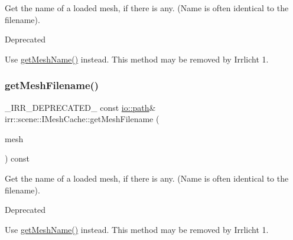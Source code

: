 Get the name of a loaded mesh, if there is any. (Name is often identical to the filename). 

\begin{DoxyRefDesc}{Deprecated}
\item[\hyperlink{deprecated__deprecated000011}{Deprecated}]Use \hyperlink{classirr_1_1scene_1_1IMeshCache_af06efb8fb21f6bba16e52d879b5d3ddd}{get\+Mesh\+Name()} instead. This method may be removed by Irrlicht 1. \end{DoxyRefDesc}
\mbox{\label{classirr_1_1scene_1_1IMeshCache_adc17a943cd79a94710def8dd7d2de605}} 
\subsubsection{\texorpdfstring{get\+Mesh\+Filename()}{getMeshFilename()}\hspace{0.1cm}{\footnotesize\ttfamily [4/4]}}
{\footnotesize\ttfamily \+\_\+\+I\+R\+R\+\_\+\+D\+E\+P\+R\+E\+C\+A\+T\+E\+D\+\_\+ const \hyperlink{namespaceirr_1_1io_a6468281622ce3a1c46b72e19f32dded5}{io\+::path}\& irr\+::scene\+::\+I\+Mesh\+Cache\+::get\+Mesh\+Filename (\begin{DoxyParamCaption}\item[{const \hyperlink{classirr_1_1scene_1_1IMesh}{I\+Mesh} $\ast$const}]{mesh }\end{DoxyParamCaption}) const\hspace{0.3cm}{\ttfamily [inline]}}



Get the name of a loaded mesh, if there is any. (Name is often identical to the filename). 

\begin{DoxyRefDesc}{Deprecated}
\item[\hyperlink{deprecated__deprecated000037}{Deprecated}]Use \hyperlink{classirr_1_1scene_1_1IMeshCache_af06efb8fb21f6bba16e52d879b5d3ddd}{get\+Mesh\+Name()} instead. This method may be removed by Irrlicht 1. \end{DoxyRefDesc}
\mbox{\label{classirr_1_1scene_1_1IMeshCache_a2b3512bd3ff11d0b290fa5d2d580eb54}} 
